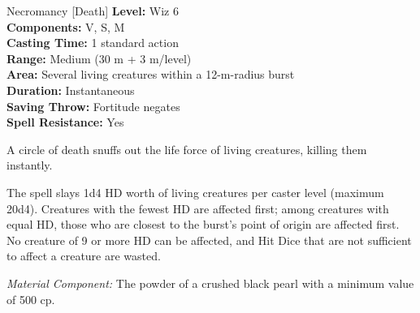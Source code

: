 {Necromancy [Death]}
{
	\textbf{Level:}
	Wiz 6\\
	\textbf{Components:}
	V, S, M\\
	\textbf{Casting Time:}
	1 standard action\\
	\textbf{Range:}
	Medium (30 m + 3 m/level)\\
	\textbf{Area:}
	Several living creatures within a 12-m-radius burst\\
	\textbf{Duration:}
	Instantaneous\\
	\textbf{Saving Throw:}
	Fortitude negates\\
	\textbf{Spell Resistance:}
	Yes\\
}
{
	A circle of death snuffs out the life force of living creatures, killing them instantly.

	The spell slays 1d4 HD worth of living creatures per caster level (maximum 20d4). Creatures with the fewest HD are affected first; among creatures with equal HD, those who are closest to the burst's point of origin are affected first. No creature of 9 or more HD can be affected, and Hit Dice that are not sufficient to affect a creature are wasted.

	\textit{Material Component:}
	The powder of a crushed black pearl with a minimum value of 500 cp.

}
